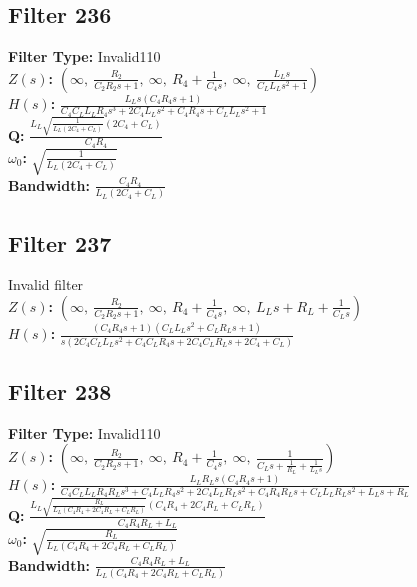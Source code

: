 \documentclass{article}
\begin{document}
\subsection*{Filter 236}
\textbf{Filter Type:} Invalid110 \\ 
\textbf{$Z(s)$:} $\left( \infty, \  \frac{R_{2}}{C_{2} R_{2} s + 1}, \  \infty, \  R_{4} + \frac{1}{C_{4} s}, \  \infty, \  \frac{L_{L} s}{C_{L} L_{L} s^{2} + 1}\right)$ \\ 
\textbf{$H(s)$:} $\frac{L_{L} s \left(C_{4} R_{4} s + 1\right)}{C_{4} C_{L} L_{L} R_{4} s^{3} + 2 C_{4} L_{L} s^{2} + C_{4} R_{4} s + C_{L} L_{L} s^{2} + 1}$ \\ 
\textbf{Q:} $\frac{L_{L} \sqrt{\frac{1}{L_{L} \left(2 C_{4} + C_{L}\right)}} \left(2 C_{4} + C_{L}\right)}{C_{4} R_{4}}$ \\ 
\textbf{$\omega_0$:} $\sqrt{\frac{1}{L_{L} \left(2 C_{4} + C_{L}\right)}}$ \\ 
\textbf{Bandwidth:} $\frac{C_{4} R_{4}}{L_{L} \left(2 C_{4} + C_{L}\right)}$ \\ 
\subsection*{Filter 237}
Invalid filter \\ 
\textbf{$Z(s)$:} $\left( \infty, \  \frac{R_{2}}{C_{2} R_{2} s + 1}, \  \infty, \  R_{4} + \frac{1}{C_{4} s}, \  \infty, \  L_{L} s + R_{L} + \frac{1}{C_{L} s}\right)$ \\ 
\textbf{$H(s)$:} $\frac{\left(C_{4} R_{4} s + 1\right) \left(C_{L} L_{L} s^{2} + C_{L} R_{L} s + 1\right)}{s \left(2 C_{4} C_{L} L_{L} s^{2} + C_{4} C_{L} R_{4} s + 2 C_{4} C_{L} R_{L} s + 2 C_{4} + C_{L}\right)}$ \\ 
\subsection*{Filter 238}
\textbf{Filter Type:} Invalid110 \\ 
\textbf{$Z(s)$:} $\left( \infty, \  \frac{R_{2}}{C_{2} R_{2} s + 1}, \  \infty, \  R_{4} + \frac{1}{C_{4} s}, \  \infty, \  \frac{1}{C_{L} s + \frac{1}{R_{L}} + \frac{1}{L_{L} s}}\right)$ \\ 
\textbf{$H(s)$:} $\frac{L_{L} R_{L} s \left(C_{4} R_{4} s + 1\right)}{C_{4} C_{L} L_{L} R_{4} R_{L} s^{3} + C_{4} L_{L} R_{4} s^{2} + 2 C_{4} L_{L} R_{L} s^{2} + C_{4} R_{4} R_{L} s + C_{L} L_{L} R_{L} s^{2} + L_{L} s + R_{L}}$ \\ 
\textbf{Q:} $\frac{L_{L} \sqrt{\frac{R_{L}}{L_{L} \left(C_{4} R_{4} + 2 C_{4} R_{L} + C_{L} R_{L}\right)}} \left(C_{4} R_{4} + 2 C_{4} R_{L} + C_{L} R_{L}\right)}{C_{4} R_{4} R_{L} + L_{L}}$ \\ 
\textbf{$\omega_0$:} $\sqrt{\frac{R_{L}}{L_{L} \left(C_{4} R_{4} + 2 C_{4} R_{L} + C_{L} R_{L}\right)}}$ \\ 
\textbf{Bandwidth:} $\frac{C_{4} R_{4} R_{L} + L_{L}}{L_{L} \left(C_{4} R_{4} + 2 C_{4} R_{L} + C_{L} R_{L}\right)}$ \\ 
\end{document}
